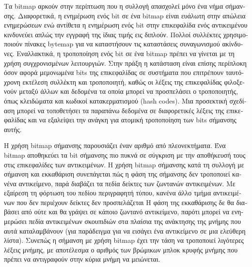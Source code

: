 \begin{greek}
Τα bitmap αρκούν στην περίπτωση που η συλλογή απασχολεί
μόνο ένα νήμα σήμανσης. Διαφορετικά, η ενημέρωση ενός bit σε
ένα bitmap είναι ευάλωτη στην απώλεια ενημερώσεων ενώ
αντίθετα η ενημέρωση ενός bit στην επικεφαλίδα ενός αντικειμένου
κινδυνεύει απλώς την εγγραφή της ίδιας τιμής εις διπλούν. Πολλοί
συλλέκτες χρησιμοποιούν πίνακες bytemap για να καταστήσουν τις
καταστάσεις συναγωνισμού ακίνδυνες. Εναλλακτικά, η τροποποίηση
ενός bit σε ένα bitmap πρέπει να γίνεται με τη χρήση
συγχρονισμένων λειτουργιών. Στην πράξη η κατάσταση είναι επίσης
περίπλοκη όσον αφορά μεμονωμένα bits της επικεφαλίδας σε συστήματα
που επιτρέπουν ταυτόχρονη εκτέλεση συλλέκτη και τροποποιητή, καθώς
οι λέξεις της επικεφαλίδας φιλοξενούν μεταξύ άλλων και δεδομένα
τα οποία μπορεί να προσπελάσει ο τροποποιητής, όπως κλειδώματα
και κωδικοί κατακερματισμού (hash codes). Μια προσεκτική σχεδίαση
μπορεί να τοποθετήσει τα παραπάνω δεδομένα σε διαφορετικές
λέξεις της επικεφαλίδας και να εξαλείψει την ανάγκη για ατομική
τροποποίηση των bits σήμανσης αυτής.

Η χρήση bitmap σήμανσης παρουσιάζει έναν αριθμό από πλεονεκτήματα.
Ένα bitmap αποθηκεύει τα bit σήμανσης πιο πυκνά σε σύγκριση με
την αποθήκευσή τους στις επικεφαλίδες των αντικειμένων. Η χρήση
bitmap σήμανσης κατά τη συλλογή με σήμανση και εκκαθάριση συνεπάγεται
πώς η φάση της σήμανσης δεν τροποποιεί κανένα αντικείμενο, παρά
διαβάζει τα πεδία δείκτες των ζωντανών αντικειμένων. Με εξαίρεση
τη φόρτωση του πεδίου περιγραφητή τύπου, κανένα άλλο τμήμα αντικειμένων
που δεν περιέχουν δείκτες δεν προσπελάζεται Η φάση της εκκαθάρισης
δε θα διαβάσει από ούτε και θα γράψει σε κάποιο ζωντανό αντικείμενο,
παρότι μπορεί να ενημερώσει πεδία αντικειμένων σκουπιδιών στα 
πλαίσια της ανάκτησης της μνήμης που αυτά καταλαμβάνουν (για παράδειγμα
για να εισάγει ένα αντικείμενο σε μια ελεύθερη λίστα). Συνεπώς 
η σήμανση με χρήση bitmap έχει την τάση να τροποποιεί λιγότερες 
λέξεις μνήμης, με αποτέλεσμα ο αριθμός των βρώμικων μπλοκ κρυφής
μνήμης που πρέπει να αντιγραφούν στην κύρια μνήμη να μειώνεται.


\end{greek}
